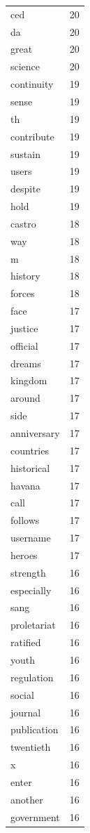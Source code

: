 \begin{tabular}{lr}
ced & 20 \\
da & 20 \\
great & 20 \\
science & 20 \\
continuity & 19 \\
sense & 19 \\
th & 19 \\
contribute & 19 \\
sustain & 19 \\
users & 19 \\
despite & 19 \\
hold & 19 \\
castro & 18 \\
way & 18 \\
m & 18 \\
history & 18 \\
forces & 18 \\
face & 17 \\
justice & 17 \\
official & 17 \\
dreams & 17 \\
kingdom & 17 \\
around & 17 \\
side & 17 \\
anniversary & 17 \\
countries & 17 \\
historical & 17 \\
havana & 17 \\
call & 17 \\
follows & 17 \\
username & 17 \\
heroes & 17 \\
strength & 16 \\
especially & 16 \\
sang & 16 \\
proletariat & 16 \\
ratified & 16 \\
youth & 16 \\
regulation & 16 \\
social & 16 \\
journal & 16 \\
publication & 16 \\
twentieth & 16 \\
x & 16 \\
enter & 16 \\
another & 16 \\
government & 16 \\

\end{tabular}
